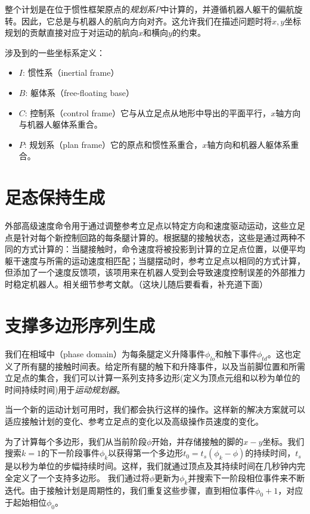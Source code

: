 整个计划是在位于惯性框架原点的\emph{规划系P}中计算的，并遵循机器人躯干的偏航旋转。因此，它总是与机器人的航向方向对齐。这允许我们在描述问题时将$x,y$坐标规划的贡献直接对应于对运动的航向$x$和横向$y$的约束。

涉及到的一些坐标系定义：
\begin{itemize}
    \item $I$: 惯性系（inertial frame）
    \item $B$: 躯体系（free-floating base）
    \item $C$: 控制系（control frame）它与从立足点从地形中导出的平面平行，$x$轴方向与机器人躯体系重合。
    \item $P$: 规划系（plan frame）它的原点和惯性系重合，$x$轴方向和机器人躯体系重合。
\end{itemize}

\section{足态保持生成\label{section:foothold}}
外部高级速度命令用于通过调整参考立足点以特定方向和速度驱动运动，这些立足点是针对每个新控制回路的每条腿计算的。根据腿的接触状态，这些是通过两种不同的方式计算的：当腿接触时，命令速度将被投影到计算的立足点位置，以便平均躯干速度与所需的运动速度相匹配；当腿摆动时，参考立足点以相同的方式计算，但添加了一个速度反馈项，该项用来在机器人受到会导致速度控制误差的外部推力时稳定机器人。相关细节参考文献\cite{Gehring_Coros_Hutter_Bellicoso_Heijnen_Diethelm_Bloesch_Fankhauser_Hwangbo_Hoepflinger_et_al_2016}。（这块儿随后要看看，补充道下面）

\section{支撑多边形序列生成\label{section:support_polygon}}
我们在相域中（phase domain）为每条腿定义升降事件$\phi_{lo}$和触下事件$\phi_{td}$。这也定义了所有腿的接触时间表。给定所有腿的触下和升降事件，以及当前脚位置和所需立足点的集合，我们可以计算一系列支持多边形(定义为顶点元组和以秒为单位的时间持续时间)用于\emph{运动规划器}。

当一个新的运动计划可用时，我们都会执行这样的操作。这样新的解决方案就可以适应接触计划的变化、参考立足点的变化以及高级操作员速度的变化。

为了计算每个多边形，我们从当前阶段$\phi$开始，并存储接触的脚的$x-y$坐标。我们搜索$k=1$的下一阶段事件$\phi_k$以获得第一个多边形$t_0=  t_s(\phi_k-\phi)$的持续时间，$t_s$是以秒为单位的步幅持续时间。这样，我们就通过顶点及其持续时间在几秒钟内完全定义了一个支持多边形。
我们通过将$\phi$更新为$\phi_k$并搜索下一阶段相位事件来不断迭代。由于接触计划是周期性的，我们重复这些步骤，直到相位事件$\phi_0+1$，对应于起始相位$\phi_0$。

